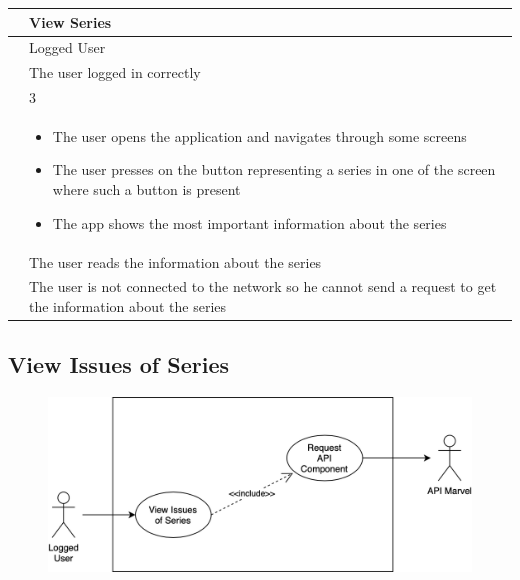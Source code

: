 {{{{{\renewcommand{\arraystretch}{2}
{\begin{center}
\begin{tabular}{ | m{4cm} | m{9cm} | } 
 \hline
 {\centering{\textbf{Name}}} & View Series \\
 \hline
 {\centering{\textbf{Actor}}} & Logged User \\
 \hline
 {\centering{\textbf{Entry Condition}}} & The user logged in correctly \\
 \hline
 {\centering{\textbf{Goal}}} & 3 \\
 \hline
 {\centering{\textbf{Event flow}}} & \begin{itemize}[leftmargin=*]
 	\item The user opens the application and navigates through some screens
	\item The user presses on the button representing a series in one of the screen where such a button is present
	\item The app shows the most important information about the series
	\end{itemize} \\	
 \hline
 {\centering{\textbf{Exit condition}}} & The user reads the information about the series \\
 \hline
 {\centering{\textbf{Exceptions}}} & The user is not connected to the network so he cannot send a request to get the information about the series \\
 \hline
\end{tabular}
\end{center}}

\clearpage

\subsection{View Issues of Series}
\begin{figure}[h]
\centering
\includegraphics[width=\textwidth]{img/usecases/viewissuesofseries}
\end{figure}

}}}}}
